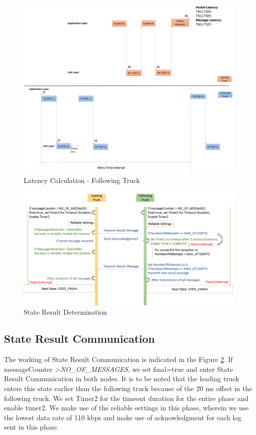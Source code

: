 \begin{figure}[h!]
	\includegraphics[width=1\textwidth]{figures/LatencyCalculationFollowingTruck}
	\centering
	\caption{Latency Calculation - Following Truck}
	\label{fig:latencyCalculationFollowingTruck}    
\end{figure}

\begin{figure}[h!]
	\includegraphics[width=1\textwidth]{figures/StateResultDetermination}
	\centering
	\caption{State Result Determination}
	\label{fig:StateResultDetermination}    
\end{figure}

\subsection{State Result Communication}
The working of State Result Communication is indicated in the Figure \ref{fig:StateResultDetermination}. If messageCounter \textgreater \emph{NO\_OF\_MESSAGES}, we set final=true and enter State Result Communication in both nodes. It is to be noted that the leading truck enters this state earlier than the following truck because of the 20 ms offset in the following truck. We set Timer2 for the timeout duration for the entire phase and enable timer2. We make use of the reliable settings in this phase, wherein we use the lowest data rate of 110 kbps and make use of acknowledgment for each log sent in this phase. 

